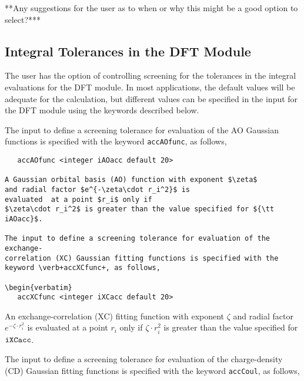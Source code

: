 \Large
**Any suggestions for the user as to when or why this might be a good option
to select?***
\normalsize



\subsection{Integral Tolerances in the DFT Module}


The user has the option of controlling screening for the tolerances in
the integral evaluations for the DFT module.  In most applications, the
default values will be adequate for the calculation, but different values
can be specified in the input for the DFT module using the keywords
described below.

The input to define a screening tolerance for evaluation of the AO 
Gaussian functions is specified with the keyword \verb+accAOfunc+, as
follows,

\begin{verbatim}
   accAOfunc <integer iAOacc default 20>

A Gaussian orbital basis (AO) function with exponent $\zeta$
and radial factor $e^{-\zeta\cdot r_i^2}$ is 
evaluated  at a point $r_i$ only if 
$\zeta\cdot r_i^2$ is greater than the value specified for ${\tt iAOacc}$.

The input to define a screening tolerance for evaluation of the exchange-
correlation (XC) Gaussian fitting functions is specified with the
keyword \verb+accXCfunc+, as follows,
 
\begin{verbatim}
   accXCfunc <integer iXCacc default 20>
\end{verbatim}

An exchange-correlation (XC) fitting function with exponent $\zeta$
and radial factor $e^{-\zeta\cdot r_i^2}$ is 
evaluated  at a point $r_i$ only if 
$\zeta\cdot r_i^2$ is greater than the value specified for ${\tt iXCacc}$.

The input to define a screening tolerance for evaluation of the
charge-density (CD) Gaussian fitting functions is specified with the
keyword \verb+accCoul+, as follows,

